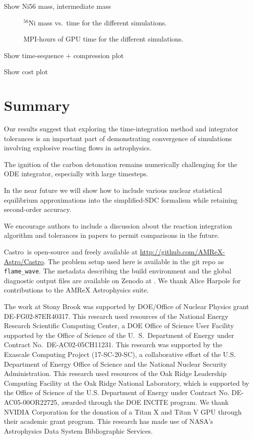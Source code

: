 \documentclass[linenumbers,trackchanges]{aastex631}
\newcommand{\isot}[2]{$^{#2}\mathrm{#1}$}
\newcommand{\castro}{{\sf Castro}}
\newcommand{\MarginPar}[1]{
    \marginpar{\vskip-\baselineskip%
               \raggedright%
               \tiny\sffamily%
               {\color{red}\hrule%
               \smallskip%
               #1\par%
               \smallskip%
               \hrule}}%
}
\begin{document}
Show Ni56 mass, intermediate mass

\begin{figure}[t]
\centering
{}
\caption{\label{fig:ni56} \isot{Ni}{56} mass vs.\ time for the different simulations.}
\end{figure}

\begin{figure}[t]
\centering
{}
\caption{\label{fig:cpu} MPI-hours of GPU time for the different simulations.}
\end{figure}


Show time-sequence + compression plot

Show cost plot

\section{Summary}

Our results suggest that exploring the time-integration method and
integrator tolerances is an important part of demonstrating
convergence of simulations involving explosive reacting flows in
astrophysics.

The ignition of the carbon detonation remains numerically challenging for the ODE integrator, especially with large timesteps.  \MarginPar{add some info on why it fails}
In the near future we will show how to include various nuclear
statistical equilibrium approximations into the simplified-SDC
formalism while retaining second-order accuracy.

We encourage authors to include a discussion about the reaction integration algorithm
and tolerances in papers to permit comparisons in the future.

\begin{acknowledgements}
\castro\ is open-source and freely available at
\url{http://github.com/AMReX-Astro/Castro}.  The problem setup used
here is available in the git repo as {\tt flame\_wave}. The metadata
describing the build environment and the global diagnostic output
files are available on Zenodo at \citet{xrb_data}.  We thank Alice
Harpole for contributions to the AMReX Astrophysics suite.

The work at Stony Brook was supported by DOE/Office of Nuclear
Physics grant DE-FG02-87ER40317.  This research used resources of the
National Energy Research Scientific Computing Center, a DOE Office of
Science User Facility supported by the Office of Science of the
U.~S.\ Department of Energy under Contract No.\ DE-AC02-05CH11231.
This research was supported by the Exascale Computing Project
(17-SC-20-SC), a collaborative effort of the U.S. Department of Energy
Office of Science and the National Nuclear Security Administration.
This research used resources of the Oak Ridge Leadership Computing
Facility at the Oak Ridge National Laboratory, which is supported by
the Office of Science of the U.S. Department of Energy under Contract
No. DE-AC05-00OR22725, awarded through the DOE INCITE program.  We
thank NVIDIA Corporation for the donation of a Titan X and Titan V GPU
through their academic grant program.  This research has made use of
NASA's Astrophysics Data System Bibliographic Services.
\end{acknowledgements}
\end{document}
